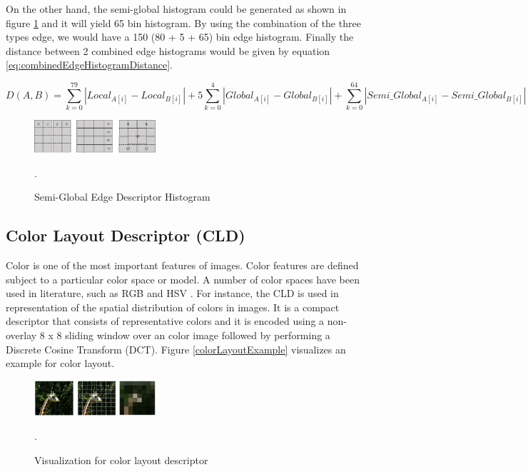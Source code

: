 \documentclass[11pt]{article}
\begin{document}
On the other hand, the semi-global histogram could be generated as shown in figure \ref{fig:semiGlobalEDH} and it will yield 65 bin histogram. By using the combination of the three types edge, we would have a 150 (80 + 5 + 65) bin edge histogram. Finally the distance between 2 combined edge histograms would be given by equation \ref{eq:combinedEdgeHistogramDistance}.

\begin{equation}\label{eq:combinedEdgeHistogramDistance}
  D(A,B) = \sum_{k = 0}^{79}{| Local_{A[i]} - Local_{B[i]}|} + 5 \sum_{k = 0}^{4}{| Global_{A[i]} - Global_{B[i]}|} + \sum_{k = 0}^{64}{| Semi\_Global_{A[i]} - Semi\_Global_{B[i]}|}
\end{equation}


\begin{figure}[h]
\centering
\includegraphics[width=0.4\textwidth]{semiGlobalEDH}
\caption{Semi-Global Edge Descriptor Histogram}.
\label{fig:semiGlobalEDH}
\end{figure}


\subsection{Color Layout Descriptor (CLD)}

Color is one of the most important features of images. Color features are defined subject to a particular color space or model. A number of color spaces have been used in literature, such as RGB and HSV \cite{goshtasby2012image}. For instance, the CLD is used in representation of the spatial distribution of colors in images. It is a compact descriptor that consists of representative colors and it is encoded using a non-overlay 8 x 8 sliding window over an color image followed by performing a Discrete Cosine Transform (DCT)\cite{tsai2016design, balasubramani2009efficient}. Figure \ref{colorLayoutExample} visualizes an example for color layout.


\begin{figure}[h]
\centering
\includegraphics[width=0.4\textwidth]{colorLayoutExample}
\caption{Visualization for color layout descriptor}.
\label{fig:colorLayoutExample}
\end{figure}
\end{document}
